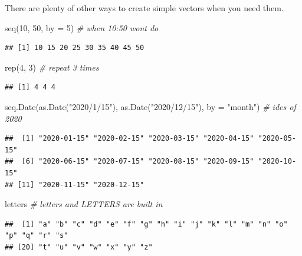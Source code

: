 \documentclass[
]{book}
\newenvironment{Shaded}{\begin{snugshade}}{\end{snugshade}}
\newcommand{\AttributeTok}[1]{\textcolor[rgb]{0.77,0.63,0.00}{#1}}
\newcommand{\CommentTok}[1]{\textcolor[rgb]{0.56,0.35,0.01}{\textit{#1}}}
\newcommand{\DecValTok}[1]{\textcolor[rgb]{0.00,0.00,0.81}{#1}}
\newcommand{\FunctionTok}[1]{\textcolor[rgb]{0.00,0.00,0.00}{#1}}
\newcommand{\NormalTok}[1]{#1}
\newcommand{\StringTok}[1]{\textcolor[rgb]{0.31,0.60,0.02}{#1}}
\begin{document}
There are plenty of other ways to create simple vectors when you need them.

\begin{Shaded}
\begin{Highlighting}[]
\FunctionTok{seq}\NormalTok{(}\DecValTok{10}\NormalTok{, }\DecValTok{50}\NormalTok{, }\AttributeTok{by =} \DecValTok{5}\NormalTok{) }\CommentTok{\# when 10:50 won\textquotesingle{}t do}
\end{Highlighting}
\end{Shaded}

\begin{verbatim}
## [1] 10 15 20 25 30 35 40 45 50
\end{verbatim}

\begin{Shaded}
\begin{Highlighting}[]
\FunctionTok{rep}\NormalTok{(}\DecValTok{4}\NormalTok{, }\DecValTok{3}\NormalTok{) }\CommentTok{\# repeat 3 times}
\end{Highlighting}
\end{Shaded}

\begin{verbatim}
## [1] 4 4 4
\end{verbatim}

\begin{Shaded}
\begin{Highlighting}[]
\FunctionTok{seq.Date}\NormalTok{(}\FunctionTok{as.Date}\NormalTok{(}\StringTok{"2020/1/15"}\NormalTok{), }\FunctionTok{as.Date}\NormalTok{(}\StringTok{"2020/12/15"}\NormalTok{), }\AttributeTok{by =} \StringTok{"month"}\NormalTok{) }\CommentTok{\# ides of 2020}
\end{Highlighting}
\end{Shaded}

\begin{verbatim}
##  [1] "2020-01-15" "2020-02-15" "2020-03-15" "2020-04-15" "2020-05-15"
##  [6] "2020-06-15" "2020-07-15" "2020-08-15" "2020-09-15" "2020-10-15"
## [11] "2020-11-15" "2020-12-15"
\end{verbatim}

\begin{Shaded}
\begin{Highlighting}[]
\NormalTok{letters }\CommentTok{\# \textquotesingle{}letters\textquotesingle{} and \textquotesingle{}LETTERS\textquotesingle{} are built in}
\end{Highlighting}
\end{Shaded}

\begin{verbatim}
##  [1] "a" "b" "c" "d" "e" "f" "g" "h" "i" "j" "k" "l" "m" "n" "o" "p" "q" "r" "s"
## [20] "t" "u" "v" "w" "x" "y" "z"
\end{verbatim}
\end{document}

